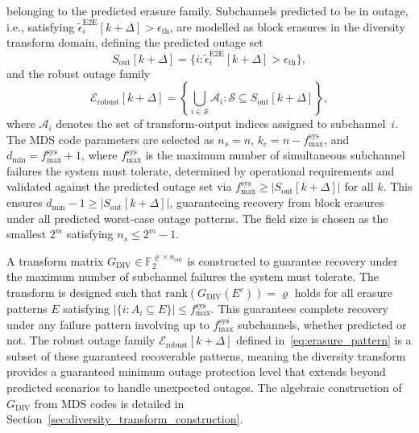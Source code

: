 \documentclass[lettersize,journal]{IEEEtran}
\begin{document}
belonging to the predicted erasure family. Subchannels predicted to 
be in outage, i.e., satisfying 
$\tilde{\epsilon}_{i}^{\mathrm{E2E}}[k+\Delta] > \epsilon_{\mathrm{th}}$, 
are modelled as block erasures in the diversity transform domain, 
defining the predicted outage set
\begin{equation}
S_{\mathrm{out}}[k+\Delta] = \bigl\{i : 
\tilde{\epsilon}_{i}^{\mathrm{E2E}}[k+\Delta] > 
\epsilon_{\mathrm{th}}\bigr\},
\label{eq:outage_set}
\end{equation}
and the robust outage family
\begin{equation}
\mathcal{E}_{\mathrm{robust}}[k+\Delta] = \left\{ 
\bigcup_{i\in \mathcal{S}} \mathcal{A}_i : 
\mathcal{S} \subseteq S_{\mathrm{out}}[k+\Delta] \right\},
\label{eq:erasure_pattern}
\end{equation}
where $\mathcal{A}_i$ denotes the set of transform-output indices 
assigned to subchannel~$i$. The MDS code parameters are selected as $n_s = n$, $k_c = n - f_{\mathrm{max}}^{\mathrm{sys}}$, and 
$d_{\min} = f_{\mathrm{max}}^{\mathrm{sys}} + 1$, where 
$f_{\mathrm{max}}^{\mathrm{sys}}$ is the maximum number of 
simultaneous subchannel failures the system must tolerate, 
determined by operational requirements and validated against 
the predicted outage set via 
$f_{\mathrm{max}}^{\mathrm{sys}} \geq |S_{\mathrm{out}}[k+\Delta]|$ 
for all $k$. This ensures $d_{\min} - 1 \geq |S_{\mathrm{out}}[k+\Delta]|$, 
guaranteeing recovery from block erasures under all predicted worst-case outage patterns. The field size is chosen as the smallest $2^m$ 
satisfying $n_s \leq 2^m - 1$.

A transform matrix $G_{\mathrm{DIV}} \in \mathbb{F}_2^{\varrho \times n_{\text{out}}}$ is constructed to guarantee recovery under the maximum number of subchannel failures the system must tolerate. The transform is designed such that 
$\mathrm{rank}\!\left(G_{\mathrm{DIV}}(E^{c})\right)=\varrho$ 
holds for all erasure patterns $E$ satisfying 
$|\{i : A_i \subseteq E\}| \leq f_{\mathrm{max}}^{\mathrm{sys}}$.
This guarantees complete recovery under any failure pattern involving 
up to $f_{\mathrm{max}}^{\mathrm{sys}}$ subchannels, whether predicted 
or not. The robust outage family $\mathcal{E}_{\mathrm{robust}}[k+\Delta]$ 
defined in~\eqref{eq:erasure_pattern} is a subset of these guaranteed 
recoverable patterns, meaning the diversity transform provides a 
guaranteed minimum outage protection level that extends beyond predicted scenarios to handle unexpected outages. The algebraic construction of 
$G_{\mathrm{DIV}}$ from MDS codes is detailed in  Section~\ref{sec:diversity_transform_construction}.
\end{document}
